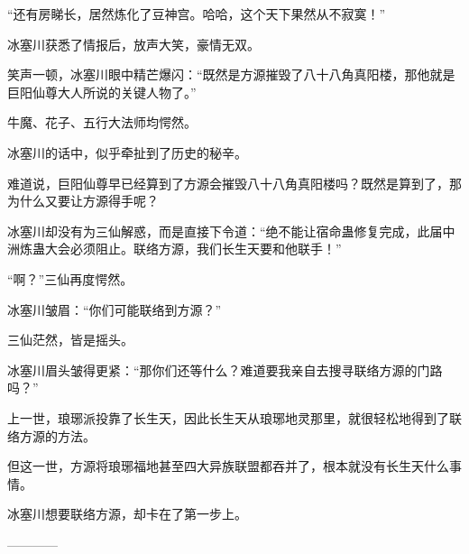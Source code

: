 \begin{this_body}
“还有房睇长，居然炼化了豆神宫。哈哈，这个天下果然从不寂寞！”

冰塞川获悉了情报后，放声大笑，豪情无双。

笑声一顿，冰塞川眼中精芒爆闪：“既然是方源摧毁了八十八角真阳楼，那他就是巨阳仙尊大人所说的关键人物了。”

牛魔、花子、五行大法师均愕然。

冰塞川的话中，似乎牵扯到了历史的秘辛。

难道说，巨阳仙尊早已经算到了方源会摧毁八十八角真阳楼吗？既然是算到了，那为什么又要让方源得手呢？

冰塞川却没有为三仙解惑，而是直接下令道：“绝不能让宿命蛊修复完成，此届中洲炼蛊大会必须阻止。联络方源，我们长生天要和他联手！”

“啊？”三仙再度愕然。

冰塞川皱眉：“你们可能联络到方源？”

三仙茫然，皆是摇头。

冰塞川眉头皱得更紧：“那你们还等什么？难道要我亲自去搜寻联络方源的门路吗？”

上一世，琅琊派投靠了长生天，因此长生天从琅琊地灵那里，就很轻松地得到了联络方源的方法。

但这一世，方源将琅琊福地甚至四大异族联盟都吞并了，根本就没有长生天什么事情。

冰塞川想要联络方源，却卡在了第一步上。

------------

\end{this_body}

